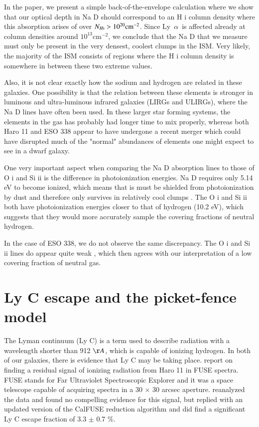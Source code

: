 \documentclass[a4wide,12pt]{book}
\newcommand{\lya}{Ly~${\alpha}$}
\begin{document}
{In the paper, we present a simple back-of-the-envelope calculation where we show that our optical depth in Na D should correspond to an H {\sc i} column density where this absorption arises of over $N_{H \textsc{i}} > 10^{20} \mathrm{cm}^{-2}$. Since \lya\ is affected already at column densities around $10^{13} \mathrm{cm}^{-2}$, we conclude that the Na D that we measure must only be present in the very densest, coolest clumps in the ISM. Very likely, the majority of the ISM consists of regions where the H {\sc i} column density is somewhere in between these two extreme values. 

Also, it is not clear exactly how the sodium and hydrogen are related in these galaxies. One possibility is that the relation between these elements is stronger in luminous and ultra-luminous infrared galaxies (LIRGs and ULIRGs), where the Na D lines have often been used. In these larger star forming systems, the elements in the gas has probably had longer time to mix properly, whereas both Haro 11 and ESO 338 appear to have undergone a recent merger which could have disrupted much of the "normal" abundances of elements one might expect to see in a dwarf galaxy. 

One very important aspect when comparing the Na D absorption lines to those of O {\sc i} and Si {\sc ii} is the difference in photoionization energies. Na D requires only 5.14 eV to become ionized, which means that is must be shielded from photoionization by dust and therefore only survives in relatively cool clumps \citep[see discussion in][]{murray-2007}. The O {\sc i} and Si {\sc ii} both have photoionization energies closer to that of hydrogen (10.2 eV), which suggests that they would more accurately sample the covering fractions of neutral hydrogen. 

In the case of ESO 338, we do not observe the same discrepancy. The O {\sc i} and Si {\sc ii} lines do appear quite weak \citep{schwartz-2006}, which then agrees with our interpretation of a low covering fraction of neutral gas. 

\section{Ly C escape and the picket-fence model}

The Lyman continuum (Ly C) is a term used to describe radiation with a wavelength shorter than 912 $\AA$, which is capable of ionizing hydrogen. In both of our galaxies, there is evidence that Ly C may be taking place. \citet{bergvall-2006} report on finding a residual signal of ionizing radiation from Haro 11 in FUSE spectra. FUSE stands for Far Ultraviolet Spectroscopic Explorer and it was a space telescope capable of acquiring spectra in a 30 $\times$ 30 arcsec aperture. \citet{grimes-2007} reanalyzed the data and found no compelling evidence for this signal, but \citet{leitet-2011} replied with an updated version of the CalFUSE reduction algorithm and did find a significant Ly C escape fraction of 3.3 $\pm$ 0.7 \%.

}
\end{document}
